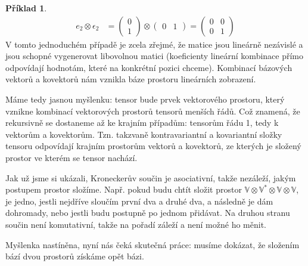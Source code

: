 \documentclass[a5paper,12pt]{amsbook}
\theoremstyle{definition}
\newtheorem{example}{Příklad}[chapter]
\newcommand{\myspace}[1]{\mathbb{#1}}
\newcommand{\mydual}[1]{\myspace{#1^{*}}}
\begin{document}
\begin{example}
\begin{equation*}
\begin{split}
e_2 \otimes \epsilon_2 &= \left(\begin{array}{c}0 \\ 1\end{array}\right) \otimes \left(\begin{array}{cc}0 & 1\end{array}\right) =
\left(\begin{array}{cc}0 & 0 \\ 0 & 1 \end{array}\right)
\end{split}
\end{equation*}
V tomto jednoduchém případě je zcela zřejmé, že matice jsou lineárně nezávislé a jsou schopné vygenerovat libovolnou matici
(koeficienty lineární kombinace přímo odpovídají hodnotám, které na konkrétní pozici chceme). Kombinací bázových vektorů
a kovektorů nám vznikla báze prostoru lineárních zobrazení.

\end{example}

\noindent
Máme tedy jasnou myšlenku: tensor bude prvek vektorového prostoru, který vznikne kombinací vektorových
prostorů tensorů menších řádů. Což znamená, že rekursivně se dostaneme až ke krajním případům: tensorům
řádu 1, tedy k vektorům a kovektorům. Tzn. takzvaně kontravariantní a kovariantní složky tensoru
odpovídají krajním prostorům vektorů a kovektorů, ze kterých je složený prostor ve kterém se tensor
nachází.

Jak už jsme si ukázali, Kroneckerův součin je asociativní, takže nezáleží, jakým postupem prostor
složíme. Např. pokud budu chtít složit prostor $\myspace{V} \otimes \mydual{V} \otimes \myspace{V}
\otimes \myspace{V}$, je jedno, jestli nejdříve sloučím první dva a druhé dva, a následně je dám
dohromady, nebo jestli budu postupně po jednom přidávat. Na druhou stranu součin není komutativní,
takže na pořadí záleží a není možné ho měnit.

Myšlenka nastíněna, nyní nás čeká skutečná práce: musíme dokázat, že složením bází dvou prostorů
získáme opět bázi.
\end{document}
